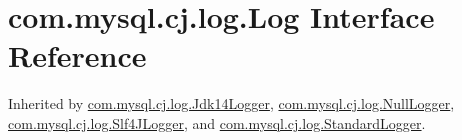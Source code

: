 \hypertarget{interfacecom_1_1mysql_1_1cj_1_1log_1_1_log}{}\section{com.\+mysql.\+cj.\+log.\+Log Interface Reference}
\label{interfacecom_1_1mysql_1_1cj_1_1log_1_1_log}


Inherited by \mbox{\hyperlink{classcom_1_1mysql_1_1cj_1_1log_1_1_jdk14_logger}{com.\+mysql.\+cj.\+log.\+Jdk14\+Logger}}, \mbox{\hyperlink{classcom_1_1mysql_1_1cj_1_1log_1_1_null_logger}{com.\+mysql.\+cj.\+log.\+Null\+Logger}}, \mbox{\hyperlink{classcom_1_1mysql_1_1cj_1_1log_1_1_slf4_j_logger}{com.\+mysql.\+cj.\+log.\+Slf4\+J\+Logger}}, and \mbox{\hyperlink{classcom_1_1mysql_1_1cj_1_1log_1_1_standard_logger}{com.\+mysql.\+cj.\+log.\+Standard\+Logger}}.

